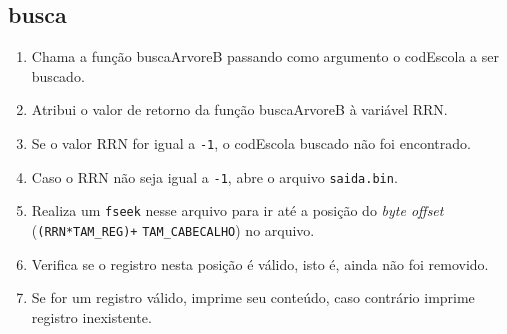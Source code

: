 \documentclass[
	12pt,				%
	openany,			%
	twoside,			%
	a4paper,			%
	english,			%
	french,				%
	spanish,			%
	brazil,				%
	]{abntex2}
\begin{document}
    \subsection{busca}
        \begin{enumerate}
            \item Chama a função buscaArvoreB passando como argumento o codEscola a ser buscado.
            \item Atribui o valor de retorno da função buscaArvoreB à variável RRN.
            \item Se o valor RRN for igual a \verb|-1|, o codEscola buscado não foi encontrado.
            \item Caso o RRN não seja igual a \verb|-1|, abre o arquivo \verb|saida.bin|.
            \item Realiza um \verb|fseek| nesse arquivo para ir até a posição do \textit{byte offset} (\verb|(RRN*TAM_REG)+| \verb|TAM_CABECALHO|) no arquivo.
            \item Verifica se o registro nesta posição é válido, isto é, ainda não foi removido.
            \item Se for um registro válido, imprime seu conteúdo, caso contrário imprime  registro inexistente.
        \end{enumerate}
\end{document}
